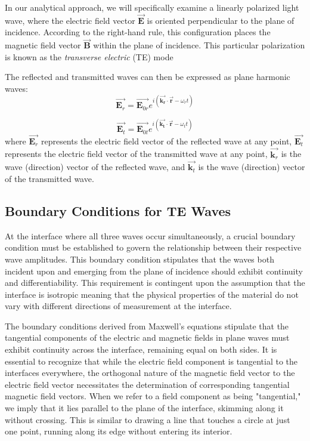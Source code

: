In our analytical approach, we will specifically examine a linearly polarized light wave, where the electric field vector $\vec{\mathbf{E}}$ is oriented perpendicular to the plane of incidence. According to the right-hand rule, this configuration places the magnetic field vector $\vec{\mathbf{B}}$ within the plane of incidence. This particular polarization is known as the \textit{transverse electric} (TE) mode

The reflected and transmitted waves can then be expressed as plane harmonic waves:
\begin{equation} \label{Plane harmonic wave equation - reflected}
\vec{\mathbf{E}_r} = \vec{\mathbf{E}_{0r}} e^{i(\vec{\mathbf{k_r}} \cdot \vec{\mathbf{r}} - \omega_r t)}
\end{equation}

\begin{equation} \label{Plane harmonic wave equation - refracted}
\vec{\mathbf{E}_t} = \vec{\mathbf{E}_{0t}} e^{i(\vec{\mathbf{k_t}} \cdot \vec{\mathbf{r}} - \omega_t t)}
\end{equation} where $\vec{\mathbf{E}_r}$ represents the electric field vector of the reflected wave at any point, $\vec{\mathbf{E}_t}$ represents the electric field vector of the transmitted wave at any point, $\vec{\mathbf{k}_r}$ is the wave (direction) vector of the reflected wave, and $\vec{\mathbf{k}_t}$ is the wave (direction) vector of the transmitted wave.


\subsection{Boundary Conditions for TE Waves}
At the interface where all three waves occur simultaneously, a crucial boundary condition must be established to govern the relationship between their respective wave amplitudes. This boundary condition stipulates that the waves both incident upon and emerging from the plane of incidence should exhibit continuity and differentiability. This requirement is contingent upon the assumption that the interface is isotropic meaning that the physical properties of the material do not vary with different directions of measurement at the interface.

The boundary conditions derived from Maxwell's equations stipulate that the tangential components of the electric and magnetic fields in plane waves must exhibit continuity across the interface, remaining equal on both sides. It is essential to recognize that while the electric field component is tangential to the interfaces everywhere, the orthogonal nature of the magnetic field vector to the electric field vector necessitates the determination of corresponding tangential magnetic field vectors. When we refer to a field component as being "tangential," we imply that it lies parallel to the plane of the interface, skimming along it without crossing. This is similar to drawing a line that touches a circle at just one point, running along its edge without entering its interior.

